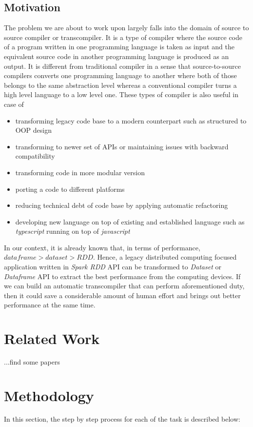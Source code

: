 \documentclass[sigplan]{acmart}\settopmatter{printfolios=true,printccs=false,printacmref=false}
\begin{document}
\subsection{Motivation}
The problem we are about to work upon largely falls into the domain of source to source compiler or transcompiler. It is a type of compiler where the source code of a program written in one programming language is taken as input and the equivalent source code in another programming language is produced as an output. It is different from traditional compiler in a sense that source-to-source compilers converts one programming language to another where both of those belongs to the same abstraction level whereas a conventional compiler turns a high level language to a low level one. These types of compiler is also useful in case of 
\begin{itemize}
    \item transforming legacy code base to a modern counterpart such as structured to OOP design \cite{zou2001framework}
    \item transforming to newer set of APIs or maintaining issues with backward compatibility
    \item transforming code in more modular version
    \item porting a code to different platforms
    \item reducing technical debt of code base by applying automatic refactoring
    \item developing new language on top of existing and established language such as \textit{typescript} running on top of \textit{javascript}
\end{itemize}

In our context, it is already known that, in terms of performance, $dataframe > dataset > RDD$. Hence, a legacy distributed computing focused application written in \textit{Spark RDD} API can be transformed to \textit{Dataset} or \textit{Dataframe} API to extract the best performance from the computing devices. If we can build an automatic transcompiler that can perform aforementioned duty, then it could save a considerable amount of human effort and brings out better performance at the same time. 

\section{Related Work}
...find some papers


\section{Methodology}
In this section, the step by step process for each of the task is described below:
\end{document}
